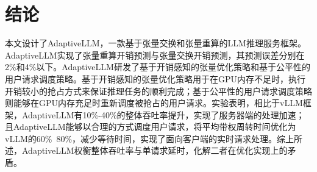 \section{结论}
本文设计了AdaptiveLLM，一款基于张量交换和张量重算的LLM推理服务框架。AdaptiveLLM实现了张量重算开销预测与张量交换开销预测，其预测误差分别在2\%和4\%以下。AdaptiveLLM研发了基于开销感知的张量优化策略和基于公平性的用户请求调度策略。基于开销感知的张量优化策略用于在GPU内存不足时，执行开销较小的抢占方式来保证推理任务的顺利完成；基于公平性的用户请求调度策略则能够在GPU内存充足时重新调度被抢占的用户请求。实验表明，相比于vLLM框架，AdaptiveLLM有10\%-40\%的整体吞吐率提升，实现了服务器端的处理加速；且AdaptiveLLM能够以合理的方式调度用户请求，将平均带权周转时间优化为vLLM的60\%~80\%，减少等待时间，实现了面向客户端的实时请求处理。综上所述，AdaptiveLLM权衡整体吞吐率与单请求延时，化解二者在优化实现上的矛盾。